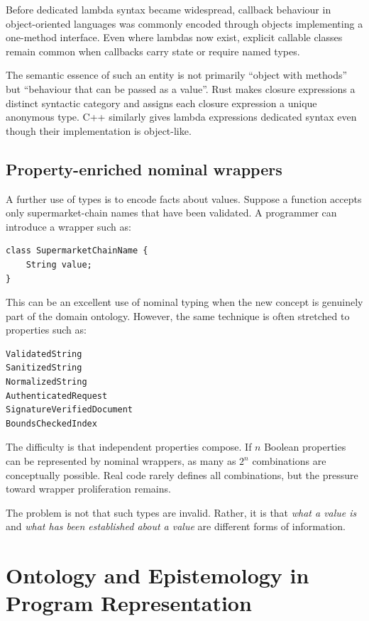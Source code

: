 \documentclass[11pt]{article}
\begin{document}
Before dedicated lambda syntax became widespread, callback behaviour in object-oriented languages was commonly encoded through objects implementing a one-method interface. Even where lambdas now exist, explicit callable classes remain common when callbacks carry state or require named types.

The semantic essence of such an entity is not primarily ``object with methods'' but ``behaviour that can be passed as a value''. Rust makes closure expressions a distinct syntactic category and assigns each closure expression a unique anonymous type. C++ similarly gives lambda expressions dedicated syntax even though their implementation is object-like.

\subsection{Property-enriched nominal wrappers}

A further use of types is to encode facts about values. Suppose a function accepts only supermarket-chain names that have been validated. A programmer can introduce a wrapper such as:

\begin{lstlisting}
class SupermarketChainName {
    String value;
}
\end{lstlisting}

This can be an excellent use of nominal typing when the new concept is genuinely part of the domain ontology. However, the same technique is often stretched to properties such as:

\begin{lstlisting}
ValidatedString
SanitizedString
NormalizedString
AuthenticatedRequest
SignatureVerifiedDocument
BoundsCheckedIndex
\end{lstlisting}

The difficulty is that independent properties compose. If $n$ Boolean properties can be represented by nominal wrappers, as many as $2^n$ combinations are conceptually possible. Real code rarely defines all combinations, but the pressure toward wrapper proliferation remains.

The problem is not that such types are invalid. Rather, it is that \emph{what a value is} and \emph{what has been established about a value} are different forms of information.

\section{Ontology and Epistemology in Program Representation}
\end{document}
